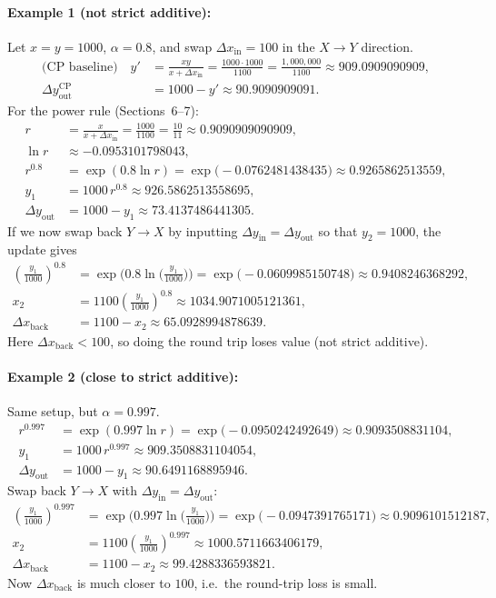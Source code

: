 \documentclass[11pt]{article}
\theoremstyle{definition}
\theoremstyle{remark}
\newcommand{\dx}{\Delta x}
\newcommand{\dy}{\Delta y}
\begin{document}
\paragraph{Example 1 (not strict additive):} Let \(x=y=1000\), \(\alpha=0.8\), and swap \(\dx_{\mathrm{in}}=100\) in the \(X\to Y\) direction.
\begin{align*}
\text{(CP baseline)}\quad
y' &= \frac{xy}{x+\dx_{\mathrm{in}}} = \frac{1000\cdot 1000}{1100} = \frac{1{,}000{,}000}{1100} \approx 909.0909090909,\\
\dy_{\mathrm{out}}^{\mathrm{CP}} &= 1000 - y' \approx 90.9090909091.
\end{align*}
For the power rule (Sections~6--7):
\begin{align*}
r &= \frac{x}{x+\dx_{\mathrm{in}}} = \frac{1000}{1100}=\frac{10}{11}\approx 0.9090909090909,\\
\ln r &\approx -0.0953101798043,\\
r^{0.8} &= \exp(0.8\ln r)=\exp\!\big(-0.0762481438435\big)\approx 0.9265862513559,\\
y_1 &= 1000\,r^{0.8} \approx 926.5862513558695,\\
\dy_{\mathrm{out}} &= 1000 - y_1 \approx 73.4137486441305.
\end{align*}
If we now swap back \(Y\to X\) by inputting \(\dy_{\mathrm{in}}=\dy_{\mathrm{out}}\) so that \(y_2=1000\), the update gives
\begin{align*}
\left(\frac{y_1}{1000}\right)^{0.8}
&= \exp\!\Big(0.8\ln\!\big(\tfrac{y_1}{1000}\big)\Big)
= \exp\!\big(-0.0609985150748\big)\approx 0.9408246368292,\\
x_2 &= 1100\left(\frac{y_1}{1000}\right)^{0.8} \approx 1034.9071005121361,\\
\dx_{\mathrm{back}} &= 1100-x_2 \approx 65.0928994878639.
\end{align*}
Here \(\dx_{\mathrm{back}}<100\), so doing the round trip loses value (not strict additive).

\paragraph{Example 2 (close to strict additive):} Same setup, but \(\alpha=0.997\).
\begin{align*}
r^{0.997} &= \exp(0.997\ln r)=\exp\!\big(-0.0950242492649\big)\approx 0.9093508831104,\\
y_1 &= 1000\,r^{0.997} \approx 909.3508831104054,\\
\dy_{\mathrm{out}} &= 1000-y_1 \approx 90.6491168895946.
\end{align*}
Swap back \(Y\to X\) with \(\dy_{\mathrm{in}}=\dy_{\mathrm{out}}\):
\begin{align*}
\left(\frac{y_1}{1000}\right)^{0.997}
&= \exp\!\Big(0.997\ln\!\big(\tfrac{y_1}{1000}\big)\Big)
= \exp\!\big(-0.0947391765171\big)\approx 0.9096101512187,\\
x_2 &= 1100\left(\frac{y_1}{1000}\right)^{0.997} \approx 1000.5711663406179,\\
\dx_{\mathrm{back}} &= 1100-x_2 \approx 99.4288336593821.
\end{align*}
Now \(\dx_{\mathrm{back}}\) is much closer to \(100\), i.e.\ the round-trip loss is small.
\end{document}
